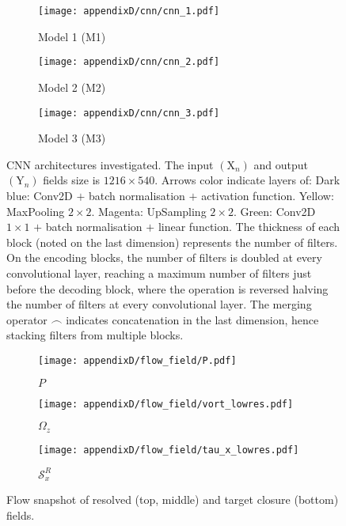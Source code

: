 \documentclass[../main.tex]{subfiles}
\begin{document}
\clearpage
\begin{figure}[!h]
	\centering
	\begin{subfigure}[t]{\linewidth}		
		\centering
		\texttt{[image: appendixD/cnn/cnn\_1.pdf]}%
		\caption{Model 1 (M1)}\vspace{0.7cm}
	\end{subfigure}
	\begin{subfigure}[t]{\linewidth}
		\centering
		\vspace{0.5cm}\texttt{[image: appendixD/cnn/cnn\_2.pdf]}%
		\caption{Model 2 (M2)}\vspace{0.9cm}
	\end{subfigure}
	\begin{subfigure}[t]{\linewidth}
		\centering
		\texttt{[image: appendixD/cnn/cnn\_3.pdf]}%
		\caption{Model 3 (M3)}
	\end{subfigure}
	\captionsetup[subfigure]{width=\linewidth}
	\caption{CNN architectures investigated.
The input $(\mathrm{X}_n)$ and output $(\mathrm{Y}_n)$ fields size is $1216\times540$.
Arrows color indicate layers of:
Dark blue: Conv2D $+$ batch normalisation $+$ activation function.
Yellow: MaxPooling $2\times2$.
Magenta: UpSampling $2\times2$.
Green: Conv2D $1\times1$ $+$ batch normalisation $+$ linear function.
The thickness of each block (noted on the last dimension) represents the number of filters.
On the encoding blocks, the number of filters is doubled at every convolutional layer, reaching a maximum number of filters just before the decoding block, where the operation is reversed halving the number of filters at every convolutional layer.
The merging operator $\frown$ indicates concatenation in the last dimension, hence stacking filters from multiple blocks.}\label{fig:cnn}
\end{figure}


\begin{figure}
	\centering
	\captionsetup[subfigure]{width=1\linewidth}
	\begin{subfigure}[t]{0.9\linewidth}		
		\centering
		\texttt{[image: appendixD/flow\_field/P.pdf]}%
	\caption{$P$}
	\end{subfigure}
	\begin{subfigure}[t]{\linewidth}		
		\centering
		\texttt{[image: appendixD/flow\_field/vort\_lowres.pdf]}%
	\caption{$\Omega_z$}
	\end{subfigure}
	\begin{subfigure}[t]{\linewidth}
		\centering
		\texttt{[image: appendixD/flow\_field/tau\_x\_lowres.pdf]}%
		\caption{$\mathcal{S}^R_x$}
	\end{subfigure}
	\caption{Flow snapshot of resolved (top, middle) and target closure (bottom) fields.} \label{fig:flow_field}
\end{figure}
\end{document}
